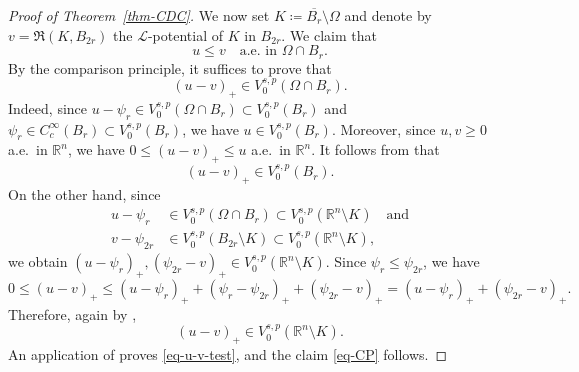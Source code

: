 \documentclass[11pt]{amsart}
\theoremstyle{plain}
\theoremstyle{definition}
\numberwithin{equation}{section}
\begin{document}
\begin{proof}[Proof of Theorem~\ref{thm-CDC}]
We now set $K\coloneqq \overline{B_r} \setminus \Omega$ and denote by $v=\mathfrak{R}(K, B_{2r})$ the $\mathcal{L}$-potential of $K$ in $B_{2r}$. We claim that
\begin{equation}\label{eq-CP}
u \leq v \quad\text{a.e.\ in } \Omega \cap B_r.
\end{equation}
By the comparison principle, it suffices to prove that
\begin{equation}\label{eq-u-v-test}
(u-v)_+ \in V^{s, p}_0(\Omega \cap B_r).
\end{equation}
Indeed, since $u-\psi_r \in V^{s, p}_0(\Omega \cap B_r) \subset V^{s, p}_0(B_r)$ and $\psi_r \in C^\infty_c(B_r) \subset V^{s, p}_0(B_r)$, we have $u \in V^{s, p}_0(B_r)$. Moreover, since $u, v \geq 0$ a.e.\ in $\mathbb{R}^n$, we have $0 \leq (u-v)_+ \leq u$ a.e.\ in $\mathbb{R}^n$. It follows from \cite[Corollary~2.9]{BBK24} that
\begin{equation*}
(u-v)_+ \in V^{s, p}_0(B_r).
\end{equation*}
On the other hand, since
\begin{align*}
u-\psi_r &\in V^{s, p}_0(\Omega \cap B_r) \subset V^{s, p}_0(\mathbb{R}^n \setminus K) \quad\text{and} \\
v-\psi_{2r} &\in V^{s, p}_0(B_{2r} \setminus K) \subset V^{s, p}_0(\mathbb{R}^n \setminus K),
\end{align*}
we obtain $(u-\psi_r)_+, (\psi_{2r}-v)_+ \in V^{s, p}_0(\mathbb{R}^n \setminus K)$. Since $\psi_r \leq \psi_{2r}$, we have
\begin{equation*}
0 \leq (u-v)_+ \leq (u-\psi_r)_+ + (\psi_r - \psi_{2r})_+ + (\psi_{2r} - v)_+ = (u-\psi_r)_+ + (\psi_{2r} - v)_+.
\end{equation*}
Therefore, again by \cite[Corollary~2.9]{BBK24},
\begin{equation*}
(u-v)_+ \in V^{s, p}_0(\mathbb{R}^n \setminus K).
\end{equation*}
An application of \cite[Lemma~2.8]{BBK24} proves \eqref{eq-u-v-test}, and the claim \eqref{eq-CP} follows.


\end{proof}
\end{document}
